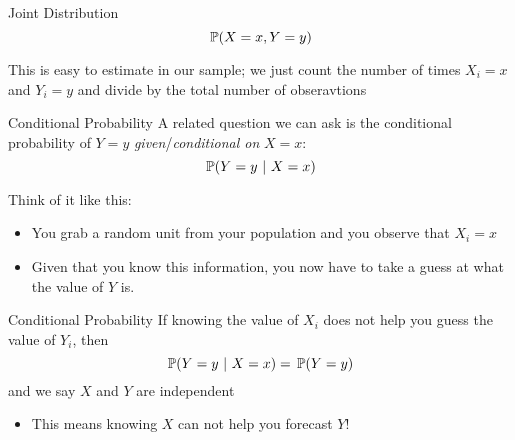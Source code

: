 \documentclass[aspectratio=169,t,11pt,table]{beamer}
\begin{document}
\begin{frame}{Joint Distribution}
  \vspace*{-\bigskipamount}
  $$\prob{X = x, Y = y}$$

  \bigskip
  This is easy to estimate in our sample; we just count the number of times $X_i = x$ and $Y_i = y$ and divide by the total number of obseravtions
\end{frame}
  
\begin{frame}{Conditional Probability}
  A related question we can ask is the \alert{conditional probability} of $Y = y$ \emph{given}/\emph{conditional on} $X = x$:
  $$
    \prob{Y = y}{X = x}
  $$
  
  \bigskip
  Think of it like this:
  \begin{itemize}
    \item You grab a random unit from your population and you observe that $X_i = x$
    \item Given that you know this information, you now have to take a guess at what the value of $Y$ is. 
  \end{itemize}
\end{frame}


\begin{frame}{Conditional Probability}
  If knowing the value of $X_i$ does not help you guess the value of $Y_i$, then
  $$
    \prob{Y = y}{X = x} = \prob{Y = y}
  $$ 
  and we say $X$ and $Y$ are \alert{independent}
  
  \begin{itemize}
    \item This means knowing $X$ can not help you forecast $Y$!
  \end{itemize}
\end{frame}
\end{document}
